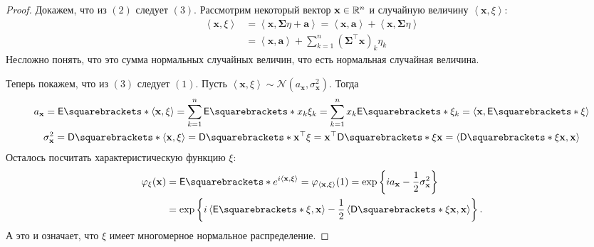 \begin{proof}
	Докажем, что из \((2)\) следует \((3)\). Рассмотрим некоторый вектор \(\mathbf{x} \in \mathbb{R}^n\) и случайную величину \(\left\langle\mathbf{x}, \xi\right\rangle\):
	\begin{align*}
		\left\langle\mathbf{x}, \xi\right\rangle &= \left\langle\mathbf{x}, \mathbf{\Sigma}\eta + \mathbf{a}\right\rangle = \left\langle\mathbf{x}, \mathbf{a}\right\rangle + \left\langle\mathbf{x}, \mathbf{\Sigma}\eta\right\rangle \\
		&= \left\langle\mathbf{x}, \mathbf{a}\right\rangle + \sum_{k = 1}^{n} \left(\mathbf{\Sigma^{\top} x}\right)_{k}\eta_{k}
	\end{align*}
	Несложно понять, что это сумма нормальных случайных величин, что есть нормальная случайная величина.
	
	Теперь покажем, что из \((3)\) следует \((1)\). %
	Пусть \(\left\langle\mathbf{x}, \xi\right\rangle \sim \mathcal{N}(a_{\mathbf{x}}, \sigma_{\mathbf{x}}^2)\). Тогда
	\begin{gather*}
		a_{\mathbf{x}} = \E{\left\langle\mathbf{x}, \xi\right\rangle} = \sum_{k = 1}^{n} \E{x_{k}\xi_{k}} = \sum_{k = 1}^{n} x_{k}\E{\xi_{k}} = \left\langle\mathbf{x}, \E{\xi}\right\rangle \\
		\sigma_{\mathbf{x}}^2 = \D{\left\langle\mathbf{x}, \xi\right\rangle} =  \D{\mathbf{x}^{\top}\xi} = \mathbf{x}^{\top}\D{\xi}\mathbf{x} = \left\langle\D{\xi}\mathbf{x}, \mathbf{x}\right\rangle
	\end{gather*}
	Осталось посчитать характеристическую функцию \(\xi\):
	\begin{align}
		\phi_{\xi}(\mathbf{x}) &= \E{e^{i\left\langle\mathbf{x}, \xi\right\rangle}} = \phi_{\left\langle\mathbf{x}, \xi\right\rangle}(1) = \exp\left\{ia_{\mathbf{x}} - \frac{1}{2}\sigma_{\mathbf{x}}^2\right\} \\
		&= \exp\left\{i\left\langle\E{\xi}, \mathbf{x}\right\rangle - \frac{1}{2}\left\langle\D{\xi}\mathbf{x}, \mathbf{x}\right\rangle\right\}.
	\end{align}
	А это и означает, что \(\xi\) имеет многомерное нормальное распределение.
	
\end{proof}